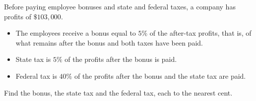 Before paying employee bonuses and state and federal taxes, a company has profits of $\$103{,}000$.
\begin{itemize}
\item The employees receive a bonus equal to $5\%$ of the after-tax profits, that is, of what remains after the bonus and both taxes have been paid.
\item State tax is $5\%$ of the profits after the bonus is paid.
\item Federal tax is $40\%$ of the profits after the bonus and the state tax are paid.
\end{itemize}
Find the bonus, the state tax and the federal tax, each to the nearest cent.
